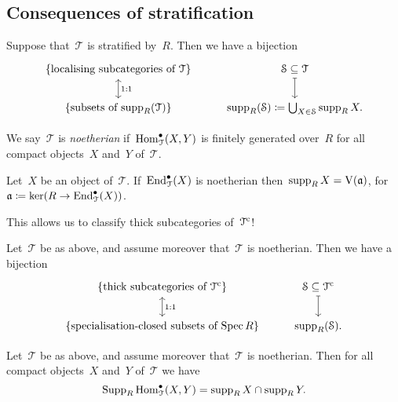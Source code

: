 \documentclass[10pt,a4paper]{article}
\begin{document}
\subsection{Consequences of stratification}
\begin{theorem}
  Suppose that~$\mathcal{T}$ is stratified by~$R$. Then we have a bijection
  \begin{equation}
    \begin{tikzcd}
      \left\{ \text{localising subcategories of~$\mathcal{T}$} \right\} \arrow[leftrightarrow]{d}{1:1} & \mathcal{S}\subseteq\mathcal{T} \arrow[mapsto]{d} \\
      \left\{ \text{subsets of $\supp_R(\mathcal{T})$} \right\} & \supp_R(\mathcal{S})\coloneqq\bigcup_{X\in\mathcal{S}}\supp_R X.
    \end{tikzcd}
  \end{equation}
\end{theorem}

We say~$\mathcal{T}$ is \emph{noetherian} if~$\operatorname{Hom}_{\mathcal{T}}^\bullet(X,Y)$ is finitely generated over~$R$ for all compact objects~$X$ and~$Y$ of~$\mathcal{T}$.
\begin{lemma}
  Let~$X$ be an object of~$\mathcal{T}$. If~$\operatorname{End}_{\mathcal{T}}^\bullet(X)$ is noetherian then~$\operatorname{supp}_R X=\operatorname{V}(\mathfrak{a})$, for~$\mathfrak{a}\coloneqq\ker(R\to\operatorname{End}_{\mathcal{T}}^\bullet(X))$.
\end{lemma}
This allows us to classify thick subcategories of~$\mathcal{T}^{\mathrm{c}}$!
\begin{theorem}
  Let~$\mathcal{T}$ be as above, and assume moreover that~$\mathcal{T}$ is noetherian. Then we have a bijection
  \begin{equation}
    \begin{tikzcd}
      \left\{ \text{thick subcategories of~$\mathcal{T}^\cc$} \right\} \arrow[leftrightarrow]{d}{1:1} & \mathcal{S}\subseteq\mathcal{T}^\cc \arrow[mapsto]{d} \\
      \left\{ \text{specialisation-closed subsets of $\Spec R$} \right\} & \supp_R(\mathcal{S}).
    \end{tikzcd}
  \end{equation}
\end{theorem}
\begin{corollary}
  Let~$\mathcal{T}$ be as above, and assume moreover that~$\mathcal{T}$ is noetherian. Then for all compact objects~$X$ and~$Y$ of~$\mathcal{T}$ we have
  \begin{equation}
    \operatorname{Supp}_R\operatorname{Hom}_{\mathcal{T}}^\bullet(X,Y)=\operatorname{supp}_R X\cap\operatorname{supp}_R Y.
  \end{equation}
\end{corollary}
\end{document}
